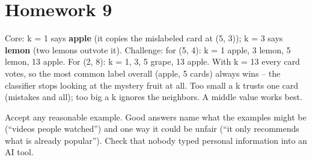 \section{Homework 9}
\begin{answer}
Core: k = 1 says \textbf{apple} (it copies the mislabeled card at (5, 3)); k = 3 says \textbf{lemon} (two lemons outvote it).
Challenge: for (5, 4): k = 1 apple, 3 lemon, 5 lemon, 13 apple. For (2, 8): k = 1, 3, 5 grape, 13 apple. With k = 13 every card votes, so the most common label overall (apple, 5 cards) always wins -- the classifier stops looking at the mystery fruit at all. Too small a k trusts one card (mistakes and all); too big a k ignores the neighbors. A middle value works best.
\end{answer}
\begin{answer}
Accept any reasonable example. Good answers name what the examples might be (\enquote{videos people watched}) and one way it could be unfair (\enquote{it only recommends what is already popular}). Check that nobody typed personal information into an AI tool.
\end{answer}
